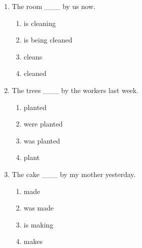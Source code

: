 \documentclass[11pt,a4paper]{ctexart}
\begin{document}
\begin{enumerate}[leftmargin=*,itemsep=4pt]
\begin{enumerate}[label=\Alph*.,leftmargin=2em,itemsep=1pt,topsep=2pt]
\item was sent
\item sends
\end{enumerate}
\item The room \_\_\_ by us now.
\begin{enumerate}[label=\Alph*.,leftmargin=2em,itemsep=1pt,topsep=2pt]
\item is cleaning
\item is being cleaned
\item cleans
\item cleaned
\end{enumerate}
\item The trees \_\_\_ by the workers last week.
\begin{enumerate}[label=\Alph*.,leftmargin=2em,itemsep=1pt,topsep=2pt]
\item planted
\item were planted
\item was planted
\item plant
\end{enumerate}
\item The cake \_\_\_ by my mother yesterday.
\begin{enumerate}[label=\Alph*.,leftmargin=2em,itemsep=1pt,topsep=2pt]
\item made
\item was made
\item is making
\item makes
\end{enumerate}
\end{enumerate}
\end{document}
